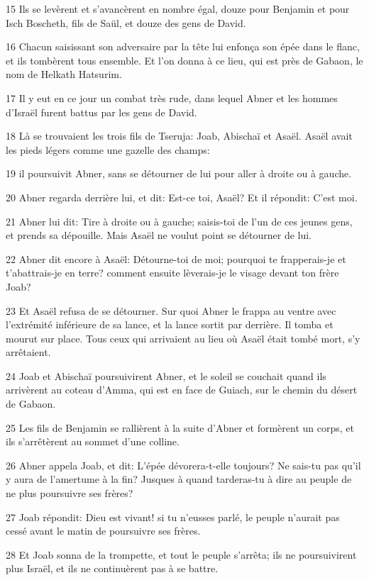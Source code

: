 \par 15 Ils se levèrent et s'avancèrent en nombre égal, douze pour Benjamin et pour Isch Boscheth, fils de Saül, et douze des gens de David.
\par 16 Chacun saisissant son adversaire par la tête lui enfonça son épée dans le flanc, et ils tombèrent tous ensemble. Et l'on donna à ce lieu, qui est près de Gabaon, le nom de Helkath Hatsurim.
\par 17 Il y eut en ce jour un combat très rude, dans lequel Abner et les hommes d'Israël furent battus par les gens de David.
\par 18 Là se trouvaient les trois fils de Tseruja: Joab, Abischaï et Asaël. Asaël avait les pieds légers comme une gazelle des champs:
\par 19 il poursuivit Abner, sans se détourner de lui pour aller à droite ou à gauche.
\par 20 Abner regarda derrière lui, et dit: Est-ce toi, Asaël? Et il répondit: C'est moi.
\par 21 Abner lui dit: Tire à droite ou à gauche; saisis-toi de l'un de ces jeunes gens, et prends sa dépouille. Mais Asaël ne voulut point se détourner de lui.
\par 22 Abner dit encore à Asaël: Détourne-toi de moi; pourquoi te frapperais-je et t'abattrais-je en terre? comment ensuite lèverais-je le visage devant ton frère Joab?
\par 23 Et Asaël refusa de se détourner. Sur quoi Abner le frappa au ventre avec l'extrémité inférieure de sa lance, et la lance sortit par derrière. Il tomba et mourut sur place. Tous ceux qui arrivaient au lieu où Asaël était tombé mort, s'y arrêtaient.
\par 24 Joab et Abischaï poursuivirent Abner, et le soleil se couchait quand ils arrivèrent au coteau d'Amma, qui est en face de Guiach, sur le chemin du désert de Gabaon.
\par 25 Les fils de Benjamin se rallièrent à la suite d'Abner et formèrent un corps, et ils s'arrêtèrent au sommet d'une colline.
\par 26 Abner appela Joab, et dit: L'épée dévorera-t-elle toujours? Ne sais-tu pas qu'il y aura de l'amertume à la fin? Jusques à quand tarderas-tu à dire au peuple de ne plus poursuivre ses frères?
\par 27 Joab répondit: Dieu est vivant! si tu n'eusses parlé, le peuple n'aurait pas cessé avant le matin de poursuivre ses frères.
\par 28 Et Joab sonna de la trompette, et tout le peuple s'arrêta; ils ne poursuivirent plus Israël, et ils ne continuèrent pas à se battre.
